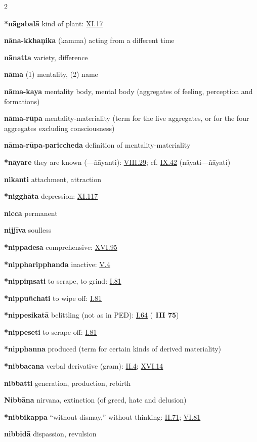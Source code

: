 \begin{multicols}{2}
\begin{vismHanging}
\par\textbf{*nāgabalā} kind of plant: \hyperlink{XI.17}{XI.17}{}
\par\textbf{nāna-kkhaṇika} (kamma) acting from a different time 
\par\textbf{nānatta} variety, difference
\par\textbf{nāma} (1) mentality, (2) name
\par\textbf{nāma-kaya} mentality body, mental body (aggregates of feeling, perception and formations) 
\par\textbf{nāma-rūpa} mentality-materiality (term for the five aggregates, or for the four aggregates excluding consciousness)
\par\textbf{nāma-rūpa-pariccheda} definition of mentality-materiality 
\par\textbf{*nāyare} they are known (—ñāyanti): \hyperlink{VIII.29}{VIII.29}{}; cf. \hyperlink{IX.42}{IX.42}{} (nāyati—ñāyati) 
\par\textbf{nikanti} attachment, attraction
\par\textbf{*nigghāta} depression: \hyperlink{XI.117}{XI.117}{}
\par\textbf{nicca} permanent
\par\textbf{nijjīva} soulless
\par\textbf{*nippadesa} comprehensive: \hyperlink{XVI.95}{XVI.95}{}
\par\textbf{*nippharipphanda} inactive: \hyperlink{V.4}{V.4}{}
\par\textbf{*nippiṃsati} to scrape, to grind: \hyperlink{I.81}{I.81}{}
\par\textbf{*nippuñchati} to wipe off: \hyperlink{I.81}{I.81}{}
\par\textbf{*nippesikatā} belittling (not as in PED): \hyperlink{I.64}{I.64}{} (\textbf{\cite{M} III 75}) 
\par\textbf{*nippeseti} to scrape off: \hyperlink{I.81}{I.81}{}
\par\textbf{*nipphanna} produced (term for certain kinds of derived materiality) 
\par\textbf{*nibbacana} verbal derivative (gram): \hyperlink{II.4}{II.4}{}; \hyperlink{XVI.14}{XVI.14}{} 
\par\textbf{nibbatti} generation, production, rebirth 
\par\textbf{Nibbāna} nirvana, extinction (of greed, hate and delusion) 
\par\textbf{*nibbikappa} “without dismay,” without thinking: \hyperlink{II.71}{II.71}{}; \hyperlink{VI.81}{VI.81}{} 
\par\textbf{nibbidā} dispassion, revulsion

\end{vismHanging}
\end{multicols}
